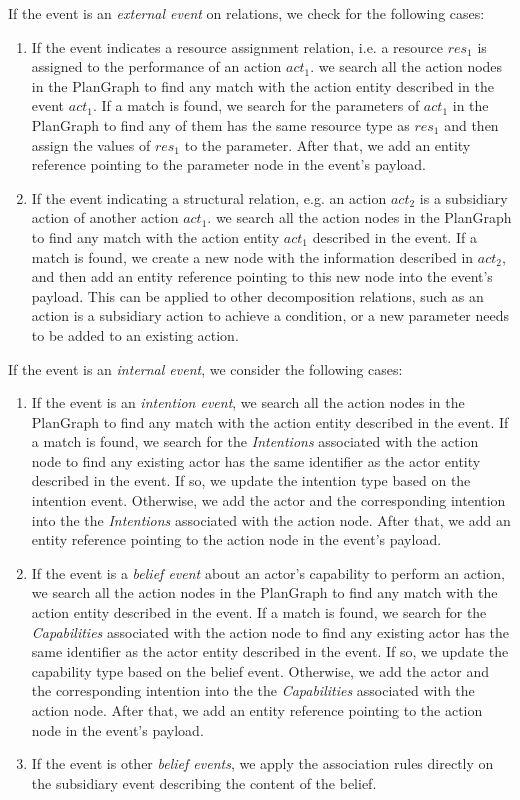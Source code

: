 If the event is an \emph{external event} on relations, we check for the following cases:
\begin{enumerate}
	\item If the event indicates a resource assignment relation, i.e. a resource $res_1$ is assigned to the performance of an action $act_1$. we search all the action nodes in the PlanGraph to find any match with the action entity described in the event $act_1$. If a match is found, we search for the parameters of $act_1$ in the PlanGraph to find any of them has the same resource type as $res_1$ and then assign the values of $res_1$ to the parameter. After that, we add an entity reference pointing to the parameter node in the event's payload. 
	\item If the event indicating a structural relation, e.g. an action $act_2$ is a subsidiary action of another action $act_1$. we search all the action nodes in the PlanGraph to find any match with the action entity $act_1$ described in the event. If a match is found, we create a new node with the information described in $act_2$, and then add an entity reference pointing to this new node into the event's payload. This can be applied to other decomposition relations, such as an action is a subsidiary action to achieve a condition, or a new parameter needs to be added to an existing action.
\end{enumerate}

If the event is an \emph{internal event}, we consider the following cases:
\begin{enumerate}
	\item If the event is an \emph{intention event}, we search all the action nodes in the PlanGraph to find any match with the action entity described in the event. If a match is found, we search for the \emph{Intentions} associated with the action node to find any existing actor has the same identifier as the actor entity described in the event. If so, we update the intention type based on the intention event. Otherwise, we add the actor and the corresponding intention into the the \emph{Intentions} associated with the action node. After that, we add an entity reference pointing to the action node in the event's payload. 
	\item If the event is a \emph{belief event} about an actor's capability to perform an action, we search all the action nodes in the PlanGraph to find any match with the action entity described in the event. If a match is found, we search for the \emph{Capabilities} associated with the action node to find any existing actor has the same identifier as the actor entity described in the event. If so, we update the capability type based on the belief event. Otherwise, we add the actor and the corresponding intention into the the \emph{Capabilities} associated with the action node. After that, we add an entity reference pointing to the action node in the event's payload. 
	\item If the event is other \emph{belief events}, we apply the association rules directly on the subsidiary event describing the content of the belief. 
\end{enumerate}

